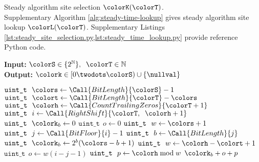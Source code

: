 \begin{algorithm}[H]
\caption{Steady algorithm site selection $\colorK(\colorT)$.\\ \footnotesize Supplementary Algorithm \ref{alg:steady-time-lookup} gives steady algorithm site lookup $\colorL(\colorT)$. Supplementary Listings \cref{lst:steady_site_selection.py,lst:steady_time_lookup.py} provide reference Python code.}
\label{alg:steady-site-selection}
\begin{minipage}{0.5\textwidth}
    \hspace*{\algorithmicindent} \textbf{Input:} $\colorS \in \{2^{\mathbb{N}}\},\;\; \colorT \in \mathbb{N}$ \\
    \hspace*{\algorithmicindent} \textbf{Output:} $\colork \in [0 \twodots \colorS) \cup \{\nullval\}$ 
    \begin{algorithmic}[1]
        \State $\texttt{uint\_t} ~ ~ \colors \gets \Call{BitLength}{\colorS} - 1$
        \State $\texttt{uint\_t} ~ ~ \colort \gets \Call{BitLength}{\colorT} - \colors $ 
        \State $\texttt{uint\_t} ~ ~ \colorh \gets \Call{CountTrailingZeros}{\colorT + 1}$ 
         
        \State \Return \nullval {}
        \EndIf
        \State $\texttt{uint\_t} ~ ~ i \gets \Call{RightShift}{\colorT, \;\; \colorh + 1}$ 
         
        \State $\texttt{uint\_t} ~ ~ \colork_b \gets 0$ 
        \State $\texttt{uint\_t} ~ ~ o \gets 0$ 
        \State $\texttt{uint\_t} ~ ~ w \gets \colors + 1$ 
        \Else
        \State $\texttt{uint\_t} ~ ~ j \gets \Call{BitFloor}{i} - 1$ 
        \State $\texttt{uint\_t} ~ ~ b \gets \Call{BitLength}{j}$ 
        \State $\texttt{uint\_t} ~ ~ \colork_b \gets 2^{b}(\colors - b + 1)$ 
        \State $\texttt{uint\_t} ~ ~ w \gets \colorh - \colort + 1$ 
        \State $\texttt{uint\_t} ~ ~ o \gets w (i - j - 1)$ 
        \EndIf
        \State $\texttt{uint\_t} ~ ~ p \gets \colorh \bmod w$ 
        \State \Return $\colork_b + o + p$ 
    \end{algorithmic}
\end{minipage}
\end{algorithm}
